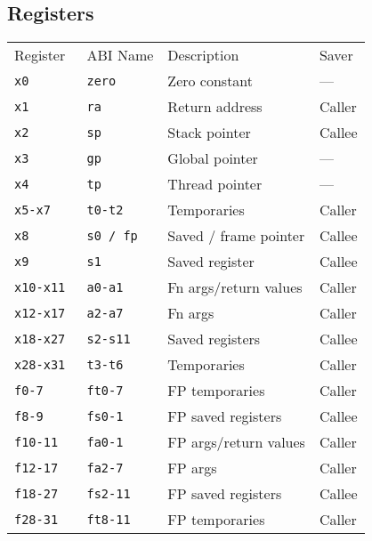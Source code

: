 \subsection{Registers}
\renewcommand{\arraystretch}{1.2}
\setlength\tabcolsep{6pt} %
\begin{tabularx}{\linewidth}{@{}llll@{}}
    Register     & ABI Name     & Description           & Saver  \\ 
    \cmidrule{1-4}
    \tt{x0}      & \tt{zero}    & Zero constant         & ---    \\
    \tt{x1}      & \tt{ra}      & Return address        & Caller \\
    \tt{x2}      & \tt{sp}      & Stack pointer         & Callee \\
    \tt{x3}      & \tt{gp}      & Global pointer        & ---    \\
    \tt{x4}      & \tt{tp}      & Thread pointer        & ---    \\
    \tt{x5-x7}   & \tt{t0-t2}   & Temporaries           & Caller \\
    \tt{x8}      & \tt{s0 / fp} & Saved / frame pointer & Callee \\
    \tt{x9}      & \tt{s1}      & Saved register        & Callee \\
    \tt{x10-x11} & \tt{a0-a1}   & Fn args/return values & Caller \\
    \tt{x12-x17} & \tt{a2-a7}   & Fn args               & Caller \\
    \tt{x18-x27} & \tt{s2-s11}  & Saved registers       & Callee \\
    \tt{x28-x31} & \tt{t3-t6}   & Temporaries           & Caller \\
    \cmidrule{1-4}
    \tt{f0-7}    & \tt{ft0-7}   & FP temporaries        & Caller \\
    \tt{f8-9}    & \tt{fs0-1}   & FP saved registers    & Callee \\
    \tt{f10-11}  & \tt{fa0-1}   & FP args/return values & Caller \\
    \tt{f12-17}  & \tt{fa2-7}   & FP args               & Caller \\
    \tt{f18-27}  & \tt{fs2-11}  & FP saved registers    & Callee \\
    \tt{f28-31}  & \tt{ft8-11}  & FP temporaries        & Caller \\
\end{tabularx}
\renewcommand{\arraystretch}{1}
\setlength\tabcolsep{6pt} %